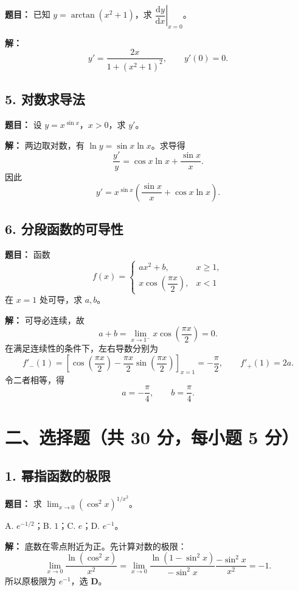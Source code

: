 \documentclass[UTF8,a4paper,11pt,fontset=fandol]{ctexart}
\begin{document}
\textbf{题目：} 已知 $y=\arctan(x^2+1)$，求 $\left.\dfrac{\mathrm{d}y}{\mathrm{d}x}\right|_{x=0}$。

\textbf{解：}
\[
y'=\frac{2x}{1+(x^2+1)^2},
\qquad \boxed{y'(0)=0}.
\]

\subsection*{5. 对数求导法}

\textbf{题目：} 设 $y=x^{\sin x}$，$x>0$，求 $y'$。

\textbf{解：} 两边取对数，有 $\ln y=\sin x\ln x$。求导得
\[
\frac{y'}y=\cos x\ln x+\frac{\sin x}{x}.
\]
因此
\[
\boxed{y'=x^{\sin x}\left(\frac{\sin x}{x}+\cos x\ln x\right)}.
\]

\subsection*{6. 分段函数的可导性}

\textbf{题目：} 函数
\[
f(x)=\begin{cases}
ax^2+b,&x\ge1,\\
x\cos\left(\dfrac{\pi x}{2}\right),&x<1
\end{cases}
\]
在 $x=1$ 处可导，求 $a,b$。

\textbf{解：} 可导必连续，故
\[
a+b=\lim_{x\to1^-}x\cos\left(\frac{\pi x}{2}\right)=0.
\]
在满足连续性的条件下，左右导数分别为
\[
f'_-(1)=\left[\cos\left(\frac{\pi x}{2}\right)
-\frac{\pi x}{2}\sin\left(\frac{\pi x}{2}\right)\right]_{x=1}
=-\frac\pi2,
\qquad f'_+(1)=2a.
\]
令二者相等，得
\[
\boxed{a=-\frac\pi4,\qquad b=\frac\pi4}.
\]

\section*{二、选择题（共 30 分，每小题 5 分）}

\subsection*{1. 幂指函数的极限}

\textbf{题目：} 求 $\displaystyle\lim_{x\to0}(\cos^2x)^{1/x^2}$。

A. $e^{-1/2}$；B. $1$；C. $e$；D. $e^{-1}$。

\textbf{解：} 底数在零点附近为正。先计算对数的极限：
\[
\lim_{x\to0}\frac{\ln(\cos^2x)}{x^2}
=\lim_{x\to0}\frac{\ln(1-\sin^2x)}{-\sin^2x}
\frac{-\sin^2x}{x^2}=-1.
\]
所以原极限为 $e^{-1}$，选 \textbf{D}。
\end{document}
